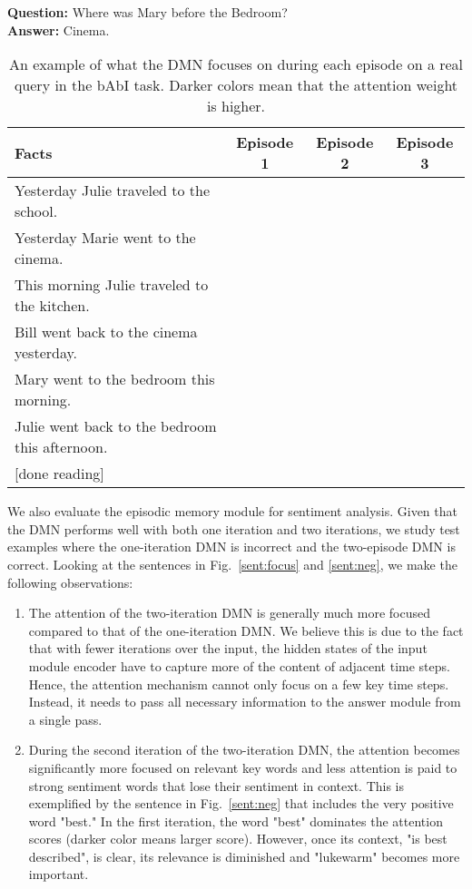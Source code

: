 \documentclass{article}
\begin{document}
\begin{table*}[t!]
\centering
\small
\begin{center}
\textbf{Question:} Where was Mary before the Bedroom? \\
\textbf{Answer:} Cinema.\\
\vspace{0.1in}
\begin{tabular}{l c c c} \toprule
    {Facts} & {Episode 1} & {Episode 2} & {Episode 3} \\ \midrule
    Yesterday Julie traveled to the school. &  &  &  \\
    Yesterday Marie went to the cinema. & & \cellcolor{coolblack!100} &  \\
    This morning Julie traveled to the kitchen. &  &  &  \\
    Bill went back to the cinema yesterday. &  &  &  \\
    Mary went to the bedroom this morning. & \cellcolor{coolblack!100} &  &  \\
    Julie went back to the bedroom this afternoon. &  &  &  \\
    {[done reading]} &  &  & \cellcolor{coolblack!100} \\
    \bottomrule
\end{tabular}
\end{center}
\caption{An example of what the DMN focuses on during each episode on a real query in the bAbI task. Darker colors mean that the attention weight is higher.}
\label{table:attn-babi}
\end{table*}

We also evaluate the episodic memory module for sentiment analysis. Given that the DMN performs well with both one iteration and two iterations, we study test examples where the one-iteration DMN is incorrect and the two-episode DMN is correct. Looking at the sentences in Fig.~\ref{sent:focus} and \ref{sent:neg}, we make the following observations:
\begin{enumerate}
\item The attention of the two-iteration DMN is generally much more focused compared to that of the one-iteration DMN. We believe this is due to the fact that with fewer iterations over the input, the hidden states of the input module encoder have to capture more of the content of adjacent time steps. Hence, the attention mechanism cannot only focus on a few key time steps. Instead, it needs to pass all necessary information to the answer module from a single pass.
\item During the second iteration of the two-iteration DMN, the attention becomes significantly more focused on relevant key words and less attention is paid to strong sentiment words that lose their sentiment in context. This is exemplified by the sentence in Fig.~\ref{sent:neg} that includes the very positive word "best." In the first iteration, the word "best" dominates the attention scores (darker color means larger score). However, once its context, "is best described", is clear, its relevance is diminished and "lukewarm" becomes more important.
\end{enumerate}
\end{document}
